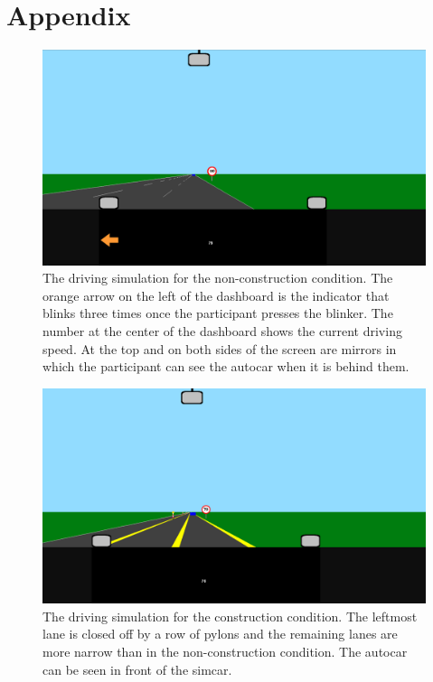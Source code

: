 
\section{Appendix}\label{ap:appendix}
\begin{figure}[!ht]
  \centering
  \includegraphics[width=\textwidth]{images/screenshot_noncon_blinker.pdf}
  \caption{The driving simulation for the non-construction condition.
  The orange arrow on the left of the dashboard is the indicator that blinks three times once the participant presses the blinker.
  The number at the center of the dashboard shows the current driving speed. 
  At the top and on both sides of the screen are mirrors in which the participant can see the autocar when it is behind them.}
  \label{fig:screenshot_noncon}
\end{figure}

\begin{figure}[!ht]
  \centering
  \includegraphics[width=\textwidth]{images/screenshot_con.pdf}
  \caption{The driving simulation for the construction condition. The leftmost lane is closed off by a row of pylons and the remaining lanes are more narrow than in the non-construction condition. The autocar can be seen in front of the simcar.}
  \label{fig:screenshot_con}
\end{figure}